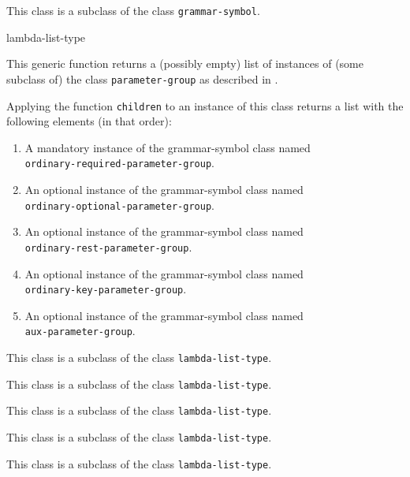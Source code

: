 
This class is a subclass of the class \texttt{grammar-symbol}.

 {lambda-list-type}

This generic function returns a (possibly empty) list of instances of
(some subclass of) the class \texttt{parameter-group} as described in
.


Applying the function \texttt{children} to an instance of this class
returns a list with the following elements (in that order):

\begin{enumerate}
\item A mandatory instance of the grammar-symbol class named\\
  \texttt{ordinary-required-parameter-group}.
\item An optional instance of the grammar-symbol class named\\
  \texttt{ordinary-optional-parameter-group}.
\item An optional instance of the grammar-symbol class named\\
\texttt{ordinary-rest-parameter-group}.
\item An optional instance of the grammar-symbol class named\\
\texttt{ordinary-key-parameter-group}.
\item An optional instance of the grammar-symbol class named\\
\texttt{aux-parameter-group}.
\end{enumerate}

This class is a subclass of the class \texttt{lambda-list-type}.


This class is a subclass of the class \texttt{lambda-list-type}.


This class is a subclass of the class \texttt{lambda-list-type}.


This class is a subclass of the class \texttt{lambda-list-type}.


This class is a subclass of the class \texttt{lambda-list-type}.

